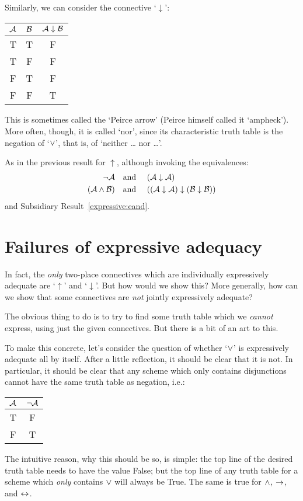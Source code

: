 Similarly, we can consider the connective `$\downarrow$':
\begin{center}
\begin{tabular}{c c | c}
$\mathcal{A}$ & $\mathcal{B}$ & $\mathcal{A} \mathrel{\downarrow} \mathcal{B}$\\
\hline
 T & T & F \\
 T & F & F  \\
 F & T & F  \\
 F & F & T
\end{tabular}
\end{center}
This is sometimes called the `Peirce arrow' (Peirce himself called it `ampheck'). More often, though, it is called `nor', since its characteristic truth table is the negation of `$\vee$', that is, of `neither \dots{} nor \dots'.

As in the previous result for $\uparrow$, although invoking the equivalences:
		\begin{align*}
			\neg \mathcal{A} &\text{\quad and \quad} (\mathcal{A} \downarrow \mathcal{A})\\
			(\mathcal{A} \wedge \mathcal{B}) & \text{\quad and \quad} ((\mathcal{A} \downarrow \mathcal{A}) \downarrow (\mathcal{B} \downarrow \mathcal{B}))
		\end{align*}
and Subsidiary Result~\ref{expressive:eand}.


\section{Failures of expressive adequacy}

In fact, the \emph{only} two-place connectives which are individually expressively adequate are `$\uparrow$' and `$\downarrow$'. But how would we show this? More generally, how can we show that some connectives are \emph{not} jointly expressively adequate? 
 
The obvious thing to do is to try to find some truth table which we \emph{cannot} express, using just the given connectives. But there is a bit of an art to this.

To make this concrete, let's consider the question of whether `$\vee$' is expressively adequate all by itself. After a little reflection, it should be clear that it is not. In particular, it should be clear that any scheme which only contains disjunctions cannot have the same truth table as negation, i.e.:
				\begin{center}
				\begin{tabular}{c | c}
				$\mathcal{A}$ & $\neg \mathcal{A}$\\
				\hline
				 T & F \\
				 F & T
				\end{tabular}
				\end{center}
The intuitive reason, why this should be so, is simple: the top line of the desired truth table needs to have the value False; but the top line of any truth table for a scheme which \emph{only} contains $\vee$ will always be True. The same is true for $\wedge$, $\rightarrow$, and $\leftrightarrow$.

